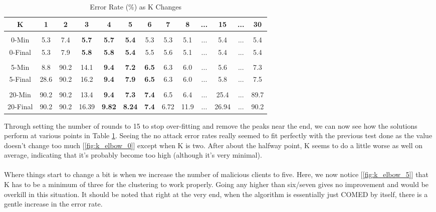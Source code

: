 \begin{center}
    \begin{longtable}{ |c|c|c|c|c|c|c|c|c|c|c|c|c| }
    \caption{Error Rate (\%) as K Changes}
    \label{tbl:k_error_rate}
    \hline
    K & 1 & 2 & 3 & 4 & 5 & 6 & 7 & 8 & ... & 15 & ... & 30 \\ \hline
    \multicolumn{13}{|c|}{} \\ \hline
    0-Min & 5.3 & 7.4 & \textbf{5.7}	& \textbf{5.7}	& \textbf{5.4}	& 5.3	& 5.3	& 5.1 & ...	& 5.4 & ... & 5.4 \\ \hline
    0-Final & 5.3	& 7.9	& \textbf{5.8}	& \textbf{5.8}	& \textbf{5.4}	& 5.5	& 5.6	& 5.1 & ...	& 5.4 & ...  & 5.4 \\ \hline
    \multicolumn{13}{|c|}{} \\ \hline
    5-Min & 8.8 &	90.2 &	14.1 &	\textbf{9.4} &	\textbf{7.2} &	\textbf{6.5} &	6.3 &	6.0 & ... &	5.6 & ...  & 7.3 \\ \hline
    5-Final & 28.6	& 90.2	& 16.2	& \textbf{9.4}	& \textbf{7.9}	& \textbf{6.5}	& 6.3	& 6.0 & ...	& 5.8 & ...  & 7.5 \\ \hline
    \multicolumn{13}{|c|}{} \\ \hline
    20-Min & 90.2	& 90.2	& 13.4	& \textbf{9.4}	& \textbf{7.3}	& \textbf{7.4}	& 6.5	& 6.4 & ...	& 25.4 & ...  & 89.7 \\ \hline
    20-Final & 90.2	& 90.2	& 16.39	& \textbf{9.82}	& \textbf{8.24}	& \textbf{7.4}	& 6.72	& 11.9	& ...	& 26.94 & ...  & 90.2 \\ \hline
    \end{longtable}
\end{center}
Through setting the number of rounds to 15 to stop over-fitting and remove the peaks near the end, we can now see how the solutions perform at various points in Table \ref{tbl:k_error_rate}.
Seeing the no attack error rates really seemed to fit perfectly with the previous test done as the value doesn't change too much [\ref{fig:k_elbow_0}] except when K is two.
After about the halfway point, K seems to do a little worse as well on average, indicating that it's probably become too high (although it's very minimal).
\\ \\
Where things start to change a bit is when we increase the number of malicious clients to five.
Here, we now notice [\ref{fig:k_elbow_5}] that K has to be a minimum of three for the clustering to work properly.
Going any higher than six/seven gives no improvement and would be overkill in this situation.
It should be noted that right at the very end, when the algorithm is essentially just COMED by itself, there is a gentle increase in the error rate.

